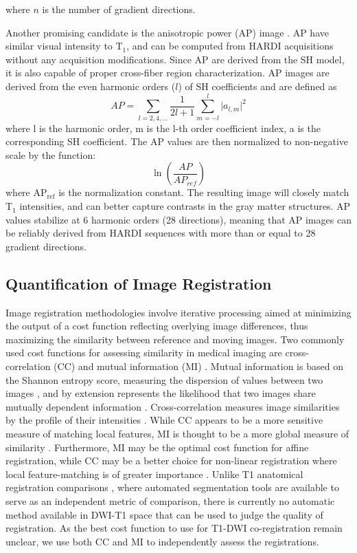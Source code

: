 where $n$ is the number of gradient directions.

Another promising candidate is the anisotropic power (AP) image \cite{DellAcqua2014}. AP have similar visual intensity to T$_1$, and can be computed from HARDI acquisitions without any acquisition modifications. Since AP are derived from the SH model, it is also capable of proper cross-fiber region characterization. AP images are derived from the even harmonic orders ($l$) of SH coefficients \cite{Descoteaux2006,Frank2002} and are defined as
\begin{equation}
AP = \sum_{l=2,4,...} \frac{1}{2l+1}\sum_{m=-l}^{l} \lvert a_{l,m}\lvert^2
\end{equation}
where l is the harmonic order, m is the l-th order coefficient index, a is the corresponding SH coefficient. The AP values are then normalized to non-negative scale by the function:
\begin{equation}
\ln( \frac{AP}{AP_{ref}})
\end{equation}
where $\text{AP}_{\text{ref}}$ is the normalization constant. The resulting image will closely match T$_1$ intensities, and can better capture contrasts in the gray matter structures. AP values stabilize at 6 harmonic orders (28 directions), meaning that AP images can be reliably derived from HARDI sequences with more than or equal to 28 gradient directions. 

\subsection{Quantification of Image Registration}

Image registration methodologies involve iterative processing aimed at minimizing the output of a cost function reflecting overlying image differences, thus maximizing the similarity between reference and moving images. Two commonly used cost functions for assessing similarity in medical imaging are cross-correlation (CC) and mutual information (MI) \cite{Liu2013,Mercier2012}. Mutual information is based on the Shannon entropy score, measuring the dispersion of values between two images \cite{Pluim2003}, and by extension represents the likelihood that two images share mutually dependent information \cite{Mattes2003}. Cross-correlation measures image similarities by the profile of their intensities \cite{Maintz1998a}. While CC appears to be a more sensitive measure of matching local features, MI is thought to be a more global measure of similarity \cite{Crum2004}. Furthermore, MI may be the optimal cost function for affine registration, while CC may be a better choice for non-linear registration where local feature-matching is of greater importance \cite{Avants2011}. Unlike T1 anatomical registration comparisons \cite{Klein2009}, where automated segmentation tools are available to serve as an independent metric of comparison, there is currently no automatic method available in DWI-T1 space that can be used to judge the quality of registration. As the best cost function to use for T1-DWI co-registration remain unclear, we use both CC and MI to independently assess the registrations. 

